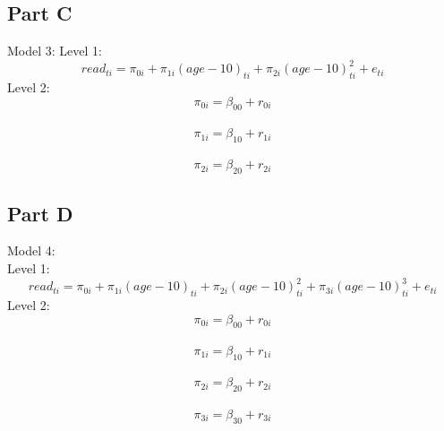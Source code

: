 \documentclass[]{article}
\newenvironment{Shaded}{\begin{snugshade}}{\end{snugshade}}
\newcommand{\KeywordTok}[1]{\textcolor[rgb]{0.13,0.29,0.53}{\textbf{#1}}}
\newcommand{\DataTypeTok}[1]{\textcolor[rgb]{0.13,0.29,0.53}{#1}}
\newcommand{\DecValTok}[1]{\textcolor[rgb]{0.00,0.00,0.81}{#1}}
\newcommand{\StringTok}[1]{\textcolor[rgb]{0.31,0.60,0.02}{#1}}
\newcommand{\OperatorTok}[1]{\textcolor[rgb]{0.81,0.36,0.00}{\textbf{#1}}}
\newcommand{\NormalTok}[1]{#1}
\begin{document}
\begin{Shaded}
\end{Shaded}

\subsection{Part C}\label{part-c}

Model 3: Level 1:
\[ read_{ti} = \pi_{0i} + \pi_{1i}(age-10)_{ti} + \pi_{2i}(age-10)^2_{ti} + e_{ti}\]
Level 2: \[ \pi_{0i} = \beta_{00} + r_{0i}\]\\
\[ \pi_{1i} = \beta_{10} + r_{1i}\]\\
\[ \pi_{2i} = \beta_{20} + r_{2i}\]

\begin{Shaded}
\end{Shaded}

\subsection{Part D}\label{part-d}

Model 4:\\
Level 1:
\[ read_{ti} = \pi_{0i} + \pi_{1i}(age-10)_{ti} + \pi_{2i}(age-10)^2_{ti} + \pi_{3i}(age-10)^3_{ti} + e_{ti}\]
Level 2: \[ \pi_{0i} = \beta_{00} + r_{0i}\]\\
\[ \pi_{1i} = \beta_{10} + r_{1i}\]\\
\[ \pi_{2i} = \beta_{20} + r_{2i}\]\\
\[ \pi_{3i} = \beta_{30} + r_{3i}\]
\end{document}
